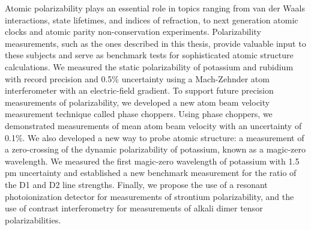Atomic polarizability plays an essential role in topics ranging from van der Waals interactions, state lifetimes, and indices of refraction, to next generation atomic clocks and atomic parity non-conservation experiments. Polarizability measurements, such as the ones described in this thesis, provide valuable input to these subjects and serve as benchmark tests for sophisticated atomic structure calculations. We measured the static polarizability of potassium and rubidium with record precision and 0.5\% uncertainty using a Mach-Zehnder atom interferometer with an electric-field gradient. To support future precision measurements of polarizability, we developed a new atom beam velocity measurement technique called phase choppers. Using phase choppers, we demonstrated measurements of mean atom beam velocity with an uncertainty of 0.1\%. We also developed a new way to probe atomic structure: a measurement of a zero-crossing of the dynamic polarizability of potassium, known as a magic-zero wavelength. We measured the first magic-zero wavelength of potassium with 1.5 pm uncertainty and established a new benchmark measurement for the ratio of the D1 and D2 line strengths. Finally, we propose the use of a resonant photoionization detector for measurements of strontium polarizability, and the use of contrast interferometry for measurements of alkali dimer tensor polarizabilities.